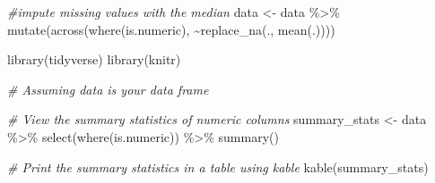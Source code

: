 \documentclass[
]{article}
\newenvironment{Shaded}{\begin{snugshade}}{\end{snugshade}}
\newcommand{\CommentTok}[1]{\textcolor[rgb]{0.56,0.35,0.01}{\textit{#1}}}
\newcommand{\FunctionTok}[1]{\textcolor[rgb]{0.00,0.00,0.00}{#1}}
\newcommand{\NormalTok}[1]{#1}
\newcommand{\OtherTok}[1]{\textcolor[rgb]{0.56,0.35,0.01}{#1}}
\newcommand{\SpecialCharTok}[1]{\textcolor[rgb]{0.00,0.00,0.00}{#1}}
\begin{document}
\begin{Shaded}
\begin{Highlighting}[]
\CommentTok{\#impute missing values with the median}
\NormalTok{data }\OtherTok{\textless{}{-}}\NormalTok{ data }\SpecialCharTok{\%\textgreater{}\%}
  \FunctionTok{mutate}\NormalTok{(}\FunctionTok{across}\NormalTok{(}\FunctionTok{where}\NormalTok{(is.numeric), }\SpecialCharTok{\textasciitilde{}}\FunctionTok{replace\_na}\NormalTok{(., }\FunctionTok{mean}\NormalTok{(.))))}
\end{Highlighting}
\end{Shaded}

\begin{Shaded}
\begin{Highlighting}[]
\FunctionTok{library}\NormalTok{(tidyverse)}
\FunctionTok{library}\NormalTok{(knitr)}

\CommentTok{\# Assuming \textasciigrave{}data\textasciigrave{} is your data frame}

\CommentTok{\# View the summary statistics of numeric columns}
\NormalTok{summary\_stats }\OtherTok{\textless{}{-}}\NormalTok{ data }\SpecialCharTok{\%\textgreater{}\%}
  \FunctionTok{select}\NormalTok{(}\FunctionTok{where}\NormalTok{(is.numeric)) }\SpecialCharTok{\%\textgreater{}\%}
  \FunctionTok{summary}\NormalTok{()}

\CommentTok{\# Print the summary statistics in a table using kable}
\FunctionTok{kable}\NormalTok{(summary\_stats)}
\end{Highlighting}
\end{Shaded}
\end{document}

